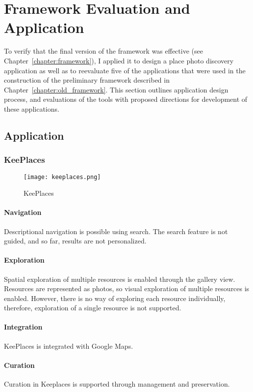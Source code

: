 \chapter{Framework Evaluation and Application}
\label{chapter:application}

To verify that the final version of the framework was effective (see Chapter~\ref{chapter:framework}), I applied it to design a place photo discovery application as well as to reevaluate five of the applications that were used in the construction of the preliminary framework described in Chapter~\ref{chapter:old_framework}. This section outlines application design process, and evaluations of the tools with proposed directions for development of these applications. 

{\section{Application}

{\subsection{KeePlaces}
\begin{figure}[ht!]
	\noindent
	\centering
	\texttt{[image: keeplaces.png]}
	\caption{KeePlaces}
	\label{fig:keeplaces} 
\end{figure}
{\subsubsection{Navigation}
Descriptional navigation is possible using search. The search feature is not guided, and so far, results are not personalized. 

}
{\subsubsection{Exploration}
Spatial exploration of multiple resources is enabled through the gallery view. 
Resources are represented as photos, so visual exploration of multiple resources is enabled. However, there is no way of exploring each resource individually, therefore, exploration of a single resource is not supported. 
}
{\subsubsection{Integration}
KeePlaces is integrated with Google Maps.
}
{\subsubsection{Curation}
Curation in Keeplaces is supported through management and preservation.

}}}

